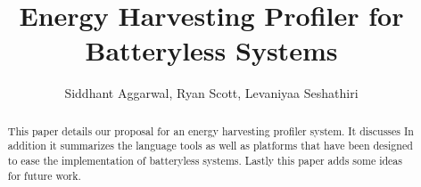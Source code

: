 \documentclass[10pt, sigconf ]{acmart}
\title{Energy Harvesting Profiler for Batteryless Systems}
\author{Siddhant Aggarwal, Ryan Scott, Levaniyaa Seshathiri}
\begin{document}
\begin{abstract}
 This paper details our proposal for an energy harvesting profiler system.
 It discusses
 In addition it summarizes the language tools as well as platforms that have been designed to ease the implementation of batteryless systems.
 Lastly this paper adds some ideas for future work.
\end{abstract}

\maketitle




%




\end{document}
